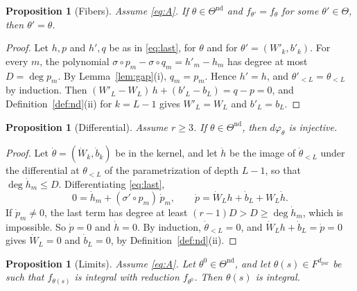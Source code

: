 \documentclass[11pt]{article}
\newtheorem{proposition}[lemma]{Proposition}
\theoremstyle{definition}
\theoremstyle{remark}
\newcommand{\dpar}{d_{\mathrm{par}}}
\newcommand{\Tn}{\Theta^{\mathrm{nd}}}
\begin{document}
\begin{proposition}[Fibers]\label{prop:fibers}
Assume \eqref{eq:A}. If $\theta\in\Tn$ and $f_{\theta'}=f_\theta$ for some $\theta'\in\Theta$, then $\theta'=\theta$.
\end{proposition}

\begin{proof}
Let $h,p$ and $h',q$ be as in \eqref{eq:last}, for $\theta$ and for $\theta'=(W'_k,b'_k)$. For every $m$, the polynomial $\sigma\circ p_m-\sigma\circ q_m=h'_m-h_m$ has degree at most $D=\deg p_m$. By Lemma~\ref{lem:gap}(i), $q_m=p_m$. Hence $h'=h$, and $\theta'_{<L}=\theta_{<L}$ by induction. Then $(W'_L-W_L)\,h+(b'_L-b_L)=q-p=0$, and Definition~\ref{def:nd}(ii) for $k=L-1$ gives $W'_L=W_L$ and $b'_L=b_L$.
\end{proof}

\begin{proposition}[Differential]\label{prop:diff}
Assume $r\ge3$. If $\theta\in\Tn$, then $d\varphi_\theta$ is injective.
\end{proposition}

\begin{proof}
Let $\dot\theta=(\dot W_k,\dot b_k)$ be in the kernel, and let $\dot h$ be the image of $\dot\theta_{<L}$ under the differential at $\theta_{<L}$ of the parametrization of depth $L-1$, so that $\deg\dot h_m\le D$. Differentiating \eqref{eq:last},
\[
0=\dot h_m+(\sigma'\circ p_m)\,\dot p_m,\qquad\dot p=\dot W_Lh+\dot b_L+W_L\dot h.
\]
If $\dot p_m\ne0$, the last term has degree at least $(r-1)D>D\ge\deg\dot h_m$, which is impossible. So $\dot p=0$ and $\dot h=0$. By induction, $\dot\theta_{<L}=0$, and $\dot W_Lh+\dot b_L=\dot p=0$ gives $\dot W_L=0$ and $\dot b_L=0$, by Definition~\ref{def:nd}(ii).
\end{proof}

\begin{proposition}[Limits]\label{prop:limits}
Assume \eqref{eq:A}. Let $\theta^0\in\Tn$, and let $\theta(s)\in F^{\dpar}$ be such that $f_{\theta(s)}$ is integral with reduction $f_{\theta^0}$. Then $\theta(s)$ is integral.
\end{proposition}
\end{document}
